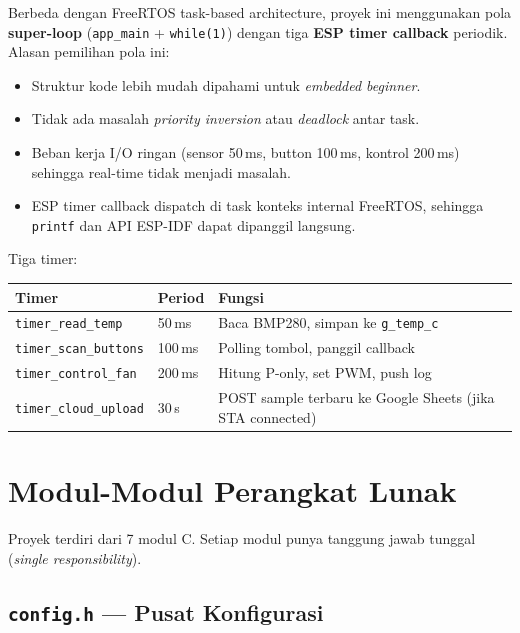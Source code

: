 \documentclass[11pt,a4paper]{article}
\begin{document}
Berbeda dengan FreeRTOS task-based architecture, proyek ini menggunakan pola \textbf{super-loop} (\texttt{app\_main} + \texttt{while(1)}) dengan tiga \textbf{ESP timer callback} periodik. Alasan pemilihan pola ini:
\begin{itemize}
    \item Struktur kode lebih mudah dipahami untuk \emph{embedded beginner}.
    \item Tidak ada masalah \emph{priority inversion} atau \emph{deadlock} antar task.
    \item Beban kerja I/O ringan (sensor 50\,ms, button 100\,ms, kontrol 200\,ms) sehingga real-time tidak menjadi masalah.
    \item ESP timer callback dispatch di task konteks internal FreeRTOS, sehingga \texttt{printf} dan API ESP-IDF dapat dipanggil langsung.
\end{itemize}

Tiga timer:
\begin{center}
\begin{tabular}{lll}
\toprule
\textbf{Timer} & \textbf{Period} & \textbf{Fungsi} \\
\midrule
\texttt{timer\_read\_temp} & 50\,ms & Baca BMP280, simpan ke \texttt{g\_temp\_c} \\
\texttt{timer\_scan\_buttons} & 100\,ms & Polling tombol, panggil callback \\
\texttt{timer\_control\_fan} & 200\,ms & Hitung P-only, set PWM, push log \\
\texttt{timer\_cloud\_upload} & 30\,s & POST sample terbaru ke Google Sheets (jika STA connected) \\
\bottomrule
\end{tabular}
\end{center}

\section{Modul-Modul Perangkat Lunak}

Proyek terdiri dari 7 modul C. Setiap modul punya tanggung jawab tunggal (\emph{single responsibility}).

\subsection{\texttt{config.h} --- Pusat Konfigurasi}
\end{document}
